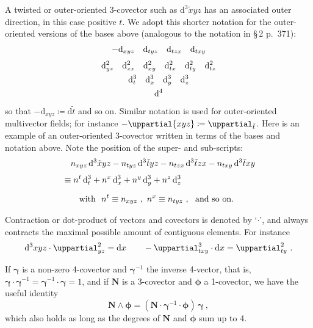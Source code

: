 \documentclass[\ifafour a4paper,12pt,\else a5paper,10pt,\fi%
onecolumn,oneside,article,%
british%
]{memoir}
\theoremstyle{remark}
\theoremstyle{innote}
\newcommand*{\de}{\uppartial}%
\newcommand*{\di}{\mathrm{d}}%
\newcommand*{\defd}{\coloneqq}
\renewcommand*{\|}[1][]{\nonscript\:#1\vert\nonscript\:\mathopen{}}
\newcommand*{\sect}{\S}%
\newcommand*{\se}[1]{\de_{#1}}
\newcommand*{\sse}[1]{\de^{2}_{#1}}
\newcommand*{\ssse}[1]{\de^{3}_{#1}}
\newcommand*{\si}[1]{\di{#1}}
\newcommand*{\sssi}[1]{\di^{3}{#1}}
\newcommand*{\tw}[1]{\tilde{#1}}
\newcommand*{\te}[1]{\de{#1}}
\newcommand*{\ti}[1]{\di_{#1}}
\newcommand*{\tti}[1]{\di^{2}_{#1}}
\newcommand*{\ttti}[1]{\di^{3}_{#1}}
\newcommand*{\tttti}[1]{\di^{4}_{#1}}
\newcommand*{\ve}{\bm{\gamma}}
\newcommand*{\vi}{\bm{\gamma}^{-1}}
\newcommand*{\yN}{\bm{N}}
\newcommand*{\yphi}{\bm{\phi}}
\begin{document}
A twisted or outer-oriented 3-covector such as $\sssi{\tw{x}yz}$ has an associated outer direction, in this case positive $t$. We adopt this shorter notation for the outer-oriented versions of the bases above (analogous to the notation in  \cites{gotayetal1992} \sect\,2 p.~371):
\begin{gather}
  \label{eq:basis_1vec_twshort}
  -\ti{xyz}\quad
  \ti{tyz}\quad
  \ti{tzx}\quad
  \ti{txy}
  \\[\jot]
  \label{eq:basis_2vec_twshort}
  \tti{yz}\quad
  \tti{zx}\quad
  \tti{xy}\quad
  \tti{tx}\quad
  \tti{ty}\quad
  \tti{tz}
  \\
  \label{eq:basis_3vec_twshort}
  \ttti{t}\quad
  \ttti{x}\quad
  \ttti{y}\quad
  \ttti{z}
  \\
  \label{eq:basis_4vec_twshort}
  \tttti{}
\end{gather}
so that $-\ti{xyz} \defd \si{\tw{t}}$ and so on. Similar notation is used for outer-oriented multivector fields; for instance $-\te{xyz} \defd \se{\tw{t}}$. Here is an example of an outer-oriented 3-covector written in terms of the bases and notation above. Note the position of the super- and sub-scripts:
\begin{equation}
  \label{eq:examples_expansion}
  \begin{split}
   &\quad n_{xyz}\,\sssi{\tw{x}yz}
    -n_{tyz}\,\sssi{\tw{t}yz}
    -n_{tzx}\,\sssi{\tw{t}zx}
    -n_{txy}\,\sssi{\tw{t}xy}
    \\[\jot]
    &\equiv
    n^{t}\,\ttti{t} +
    n^{x}\,\ttti{x} +
    n^{y}\,\ttti{y} +
    n^{z}\,\ttti{z}
    \\[2\jot]
    &\qquad\text{with }\ 
    n^{t} \equiv n_{xyz}\ ,\
    n^{x} \equiv n_{tyz}\ ,\
    \text{ and so on}.
  \end{split}
\end{equation}

\medskip

Contraction or dot-product of vectors and covectors is denoted by \enquote*{$\cdot$}, and always contracts the maximal possible amount of contiguous elements. For instance
\begin{equation}
  \label{eq:contraction_ex}
  \sssi{xyz} \cdot \sse{yz} = \si{x}
  \qquad
  -\ssse{txy} \cdot \si{x} = \sse{ty} \ .
\end{equation}

If $\ve$ is a non-zero 4-covector and $\vi$ the inverse 4-vector, that is, $\ve\cdot\vi=\vi\cdot\ve=1$, and if $\yN$ is a 3-covector and $\yphi$ a 1-covector, we have the useful identity
\begin{equation}
  \label{eq:wedge_to_dot}
  \yN \land \yphi = (\yN\cdot\vi\cdot\yphi)\, \ve \ ,
\end{equation}
which also holds as long as the degrees of $\yN$ and $\yphi$ sum up to 4.
\end{document}
